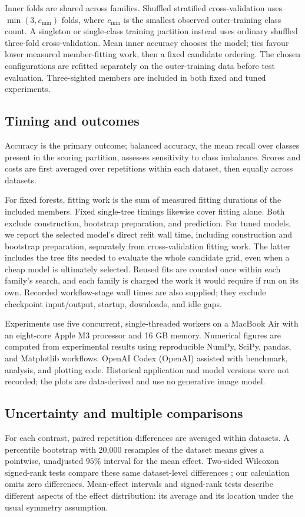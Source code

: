 \documentclass[final,5p,times]{elsarticle}
\begin{document}
Inner folds are shared across families. Shuffled stratified cross-validation uses $\min(3,c_{\min})$ folds, where $c_{\min}$ is the smallest observed outer-training class count. A singleton or single-class training partition instead uses ordinary shuffled three-fold cross-validation. Mean inner accuracy chooses the model; ties favour lower measured member-fitting work, then a fixed candidate ordering. The chosen configurations are refitted separately on the outer-training data before test evaluation. Three-sighted members are included in both fixed and tuned experiments.

\subsection{Timing and outcomes}
Accuracy is the primary outcome; balanced accuracy, the mean recall over classes present in the scoring partition, assesses sensitivity to class imbalance. Scores and costs are first averaged over repetitions within each dataset, then equally across datasets.

For fixed forests, fitting work is the sum of measured fitting durations of the included members. Fixed single-tree timings likewise cover fitting alone. Both exclude construction, bootstrap preparation, and prediction. For tuned models, we report the selected model's direct refit wall time, including construction and bootstrap preparation, separately from cross-validation fitting work. The latter includes the tree fits needed to evaluate the whole candidate grid, even when a cheap model is ultimately selected. Reused fits are counted once within each family's search, and each family is charged the work it would require if run on its own. Recorded workflow-stage wall times are also supplied; they exclude checkpoint input/output, startup, downloads, and idle gaps.

Experiments use five concurrent, single-threaded workers on a MacBook Air with an eight-core Apple M3 processor and 16 GB memory. Numerical figures are computed from experimental results using reproducible NumPy, SciPy, pandas, and Matplotlib workflows. OpenAI Codex (OpenAI) assisted with benchmark, analysis, and plotting code. Historical application and model versions were not recorded; the plots are data-derived and use no generative image model.

\subsection{Uncertainty and multiple comparisons}
For each contrast, paired repetition differences are averaged within datasets. A percentile bootstrap with 20,000 resamples of the dataset means gives a pointwise, unadjusted $95\%$ interval for the mean effect. Two-sided Wilcoxon signed-rank tests compare these same dataset-level differences \cite{demsar2006comparisons}; our calculation omits zero differences. Mean-effect intervals and signed-rank tests describe different aspects of the effect distribution: its average and its location under the usual symmetry assumption.
\end{document}
